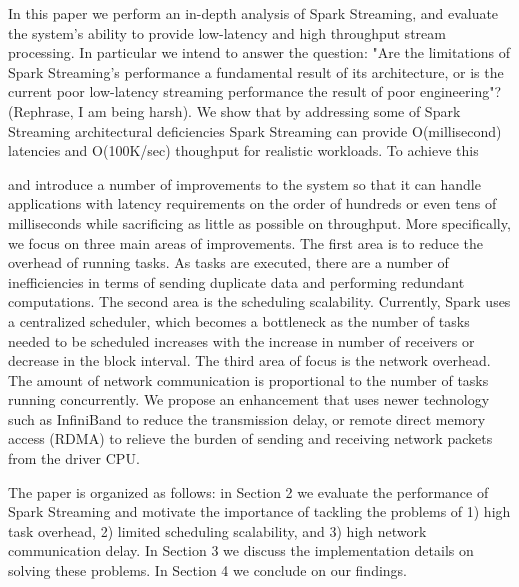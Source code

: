
In this paper we perform an in-depth analysis of Spark Streaming, and evaluate the system's ability to provide low-latency and high throughput stream processing.
In particular we intend to answer the question: "Are the limitations of Spark Streaming's performance a fundamental result of its architecture, or is the current poor low-latency streaming performance
the result of poor engineering"? (Rephrase, I am being harsh).
We show that by addressing some of Spark Streaming architectural deficiencies Spark Streaming can provide O(millisecond) latencies and O(100K/sec) thoughput for realistic workloads. 
To achieve this

   and introduce a number of improvements to the system so that it can handle applications with latency requirements on the order of hundreds or even tens of milliseconds while sacrificing as little as possible on throughput. More specifically, we focus on three main areas of improvements. The first area is to reduce the overhead of running tasks. As tasks are executed, there are a number of inefficiencies in terms of sending duplicate data and performing redundant computations. The second area is the scheduling scalability. Currently, Spark uses a centralized scheduler, which becomes a bottleneck as the number of tasks needed to be scheduled increases with the increase in number of receivers or decrease in the block interval. The third area of focus is the network overhead. The amount of network communication is proportional to the number of tasks running concurrently. We propose an enhancement that uses newer technology such as InfiniBand to reduce the transmission delay, or remote direct memory access (RDMA) to relieve the burden of sending and receiving network packets from the driver CPU.

The paper is organized as follows: in Section 2 we evaluate the performance of Spark Streaming and motivate the importance of tackling the problems of 1) high task overhead, 2) limited scheduling scalability, and 3) high network communication delay. In Section 3 we discuss the implementation details on solving these problems. In Section 4 we conclude on our findings.


